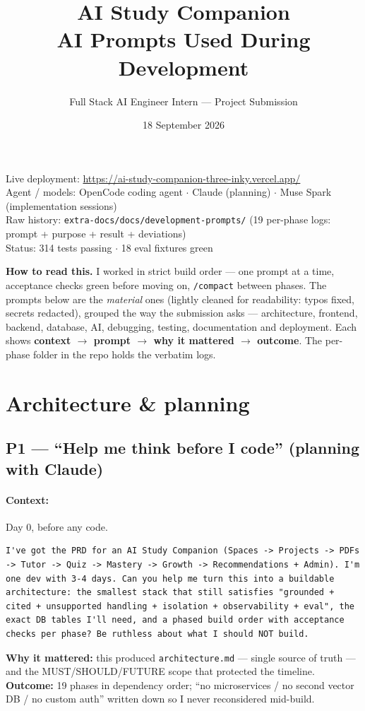 \documentclass[11pt,a4paper]{article}
\title{AI Study Companion\\AI Prompts Used During Development}
\author{Full Stack AI Engineer Intern --- Project Submission}
\date{18 September 2026}
\begin{document}
\maketitle

\noindent Live deployment: \url{https://ai-study-companion-three-inky.vercel.app/}\\
Agent / models: OpenCode coding agent $\cdot$ Claude (planning) $\cdot$ Muse Spark (implementation sessions)\\
Raw history: \texttt{extra-docs/docs/development-prompts/} (19 per-phase logs: prompt + purpose + result + deviations)\\
Status: 314 tests passing $\cdot$ 18 eval fixtures green

\tableofcontents
\newpage

\begin{shaded}
\noindent\textbf{How to read this.}
I worked in strict build order --- one prompt at a time, acceptance checks green before moving on,
\texttt{/compact} between phases. The prompts below are the \textit{material} ones (lightly cleaned
for readability: typos fixed, secrets redacted), grouped the way the submission asks --- architecture,
frontend, backend, database, AI, debugging, testing, documentation and deployment.
Each shows \textbf{context $\rightarrow$ prompt $\rightarrow$ why it mattered $\rightarrow$ outcome}.
The per-phase folder in the repo holds the verbatim logs.
\end{shaded}

\section{Architecture \& planning}

\subsection{P1 --- ``Help me think before I code'' (planning with Claude)}
\paragraph{Context:} Day 0, before any code.
\begin{lstlisting}
I've got the PRD for an AI Study Companion (Spaces -> Projects -> PDFs -> Tutor -> Quiz -> Mastery -> Growth -> Recommendations + Admin). I'm one dev with 3-4 days. Can you help me turn this into a buildable architecture: the smallest stack that still satisfies "grounded + cited + unsupported handling + isolation + observability + eval", the exact DB tables I'll need, and a phased build order with acceptance checks per phase? Be ruthless about what I should NOT build.
\end{lstlisting}
\textbf{Why it mattered:} this produced \texttt{architecture.md} --- single source of truth --- and the MUST/SHOULD/FUTURE scope that protected the timeline.\\
\textbf{Outcome:} 19 phases in dependency order; ``no microservices / no second vector DB / no custom auth'' written down so I never reconsidered mid-build.
\end{document}
